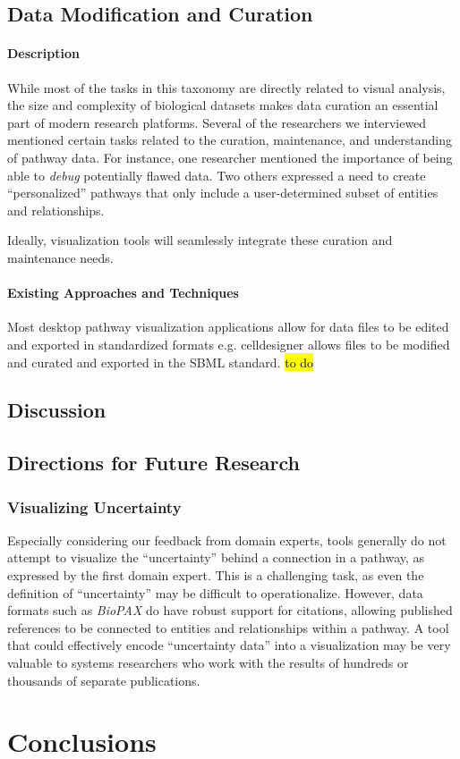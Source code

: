 \subsection*{Data Modification and Curation}

\paragraph*{Description}

While most of the tasks in this taxonomy are directly related to visual analysis, the size and complexity of biological datasets makes data curation an essential part of modern research platforms.
Several of the researchers we interviewed mentioned certain tasks related to the curation, maintenance, and understanding of pathway data.
For instance, one researcher mentioned the importance of being able to \emph{debug} potentially flawed data.
Two others expressed a need to create ``personalized'' pathways that only include a user-determined subset of entities and relationships.

Ideally, visualization tools will seamlessly integrate these curation and maintenance needs.

\paragraph*{Existing Approaches and Techniques}
Most desktop pathway visualization applications allow for data files to be edited and exported in standardized formats e.g. celldesigner\cite{funahashi2008celldesigner} allows files to be modified and curated and exported in the SBML standard.
\hl{to do}

\subsection*{Discussion}

\subsection*{Directions for Future Research}

\subsubsection*{Visualizing Uncertainty}

Especially considering our feedback from domain experts, tools generally do not attempt to visualize the ``uncertainty'' behind a connection in a pathway, as expressed by the first domain expert. This is a challenging task, as even the definition of ``uncertainty'' may be difficult to operationalize. However, data formats such as \emph{BioPAX} do have robust support for citations, allowing published references to be connected to entities and relationships within a pathway. A tool that could effectively encode ``uncertainty data'' into a visualization may be very valuable to systems researchers who work with the results of hundreds or thousands of separate publications.

\section*{Conclusions}
